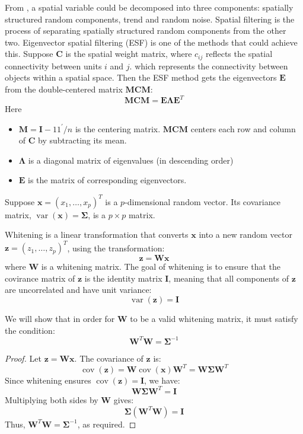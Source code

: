 \documentclass[12pt]{article}
\begin{document}
From \cite{Griffith_Chun_2014}, a spatial variable could be decomposed into three components: spatially structured random components, trend and random noise. Spatial filtering is the process of separating spatially structured random components from the other two. Eigenvector spatial filtering (ESF) is one of the methods that could achieve this. Suppose \( \mathbf{C} \) is the spatial weight matrix, where \( c_{ij} \) reflects the spatial connectivity between units \( i \) and \( j \). which represents the connectivity between objects within a spatial space. Then the ESF method gets the eigenvectors \( \mathbf{E} \) from the double-centered matrix \( \mathbf{MCM} \):
\[
  \mathbf{M C M}=\mathbf{E} \boldsymbol{\Lambda} \mathbf{E}^{T}
\]
Here
\begin{itemize}
  \item \( \mathbf{M}=\mathbf{I}-11^{\prime} / n \) is the centering matrix. \( \mathbf{MCM} \) centers each row and column of \( \mathbf{C} \) by subtracting its mean.
  \item \( \boldsymbol{\Lambda} \) is a diagonal matrix of eigenvalues (in descending order)
  \item \( \mathbf{E} \) is the matrix of corresponding eigenvectors.
\end{itemize}

Suppose \( \mathbf{x}=\left(x_1, \ldots, x_p\right)^T \) is a \( p \)-dimensional random vector. Its covariance matrix, \( \operatorname{var} (\mathbf{x}) = \boldsymbol{\Sigma} \), is a  \( p \times p \) matrix.

Whitening is a linear transformation that converts \( \mathbf{x} \) into a new random vector \( \mathbf{z}=\left(z_1, \ldots, z_p\right)^T \), using the transformation:
\[
  \mathbf{z}=\mathbf{W} \mathbf{x}
\]
where \( \mathbf{W} \) is a whitening matrix. The goal of whitening is to ensure that the covirance matrix of \( \mathbf{z} \) is the identity matrix \( \mathbf{I} \), meaning that all components of \( \mathbf{z} \) are uncorrelated and have unit variance:
\[
  \operatorname{var}(\mathbf{z})=\mathbf{I}
\]

We will show that in order for \( \mathbf{W} \) to be a valid whitening matrix, it must satisfy the condition:
\[
  \mathbf{W}^T \mathbf{W}=\boldsymbol{\Sigma}^{-1}
\]

\begin{proof}
  Let \( \mathbf{z} = \mathbf{W} \mathbf{x} \). The covariance of \( \mathbf{z} \) is:
  \[
    \operatorname{cov}(\mathbf{z}) = \mathbf{W} \operatorname{cov}(\mathbf{x}) \mathbf{W}^T = \mathbf{W} \boldsymbol{\Sigma} \mathbf{W}^T
  \]
  Since whitening ensures \( \operatorname{cov}(\mathbf{z}) = \mathbf{I} \), we have:
  \[
    \mathbf{W} \boldsymbol{\Sigma} \mathbf{W}^T = \mathbf{I}
  \]
  Multiplying both sides by \( \mathbf{W} \) gives:
  \[
    \boldsymbol{\Sigma} (\mathbf{W}^T \mathbf{W}) = \mathbf{I}
  \]
  Thus, \( \mathbf{W}^T \mathbf{W} = \boldsymbol{\Sigma}^{-1} \), as required.
\end{proof}
\end{document}
